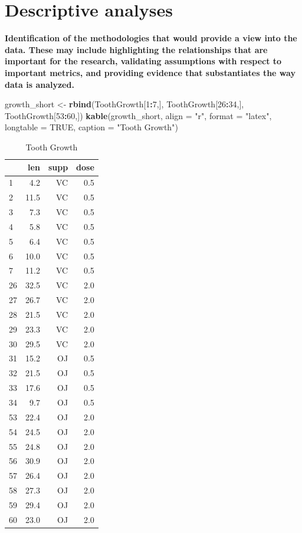 \documentclass[12pt,oneside]{chicagocapstone}
\newenvironment{Shaded}{\begin{snugshade}}{\end{snugshade}}
\newcommand{\KeywordTok}[1]{\textcolor[rgb]{0.13,0.29,0.53}{\textbf{#1}}}
\newcommand{\DataTypeTok}[1]{\textcolor[rgb]{0.13,0.29,0.53}{#1}}
\newcommand{\DecValTok}[1]{\textcolor[rgb]{0.00,0.00,0.81}{#1}}
\newcommand{\StringTok}[1]{\textcolor[rgb]{0.31,0.60,0.02}{#1}}
\newcommand{\OtherTok}[1]{\textcolor[rgb]{0.56,0.35,0.01}{#1}}
\newcommand{\OperatorTok}[1]{\textcolor[rgb]{0.81,0.36,0.00}{\textbf{#1}}}
\newcommand{\NormalTok}[1]{#1}
\begin{document}
\section*{Descriptive analyses}\label{methodology-descriptive}

\textbf{Identification of the methodologies that would provide a view
into the data. These may include highlighting the relationships that are
important for the research, validating assumptions with respect to
important metrics, and providing evidence that substantiates the way
data is analyzed.}
\begin{Shaded}
\begin{Highlighting}[]
\NormalTok{growth_short <-}\StringTok{ }\KeywordTok{rbind}\NormalTok{(ToothGrowth[}\DecValTok{1}\OperatorTok{:}\DecValTok{7}\NormalTok{,], ToothGrowth[}\DecValTok{26}\OperatorTok{:}\DecValTok{34}\NormalTok{,], ToothGrowth[}\DecValTok{53}\OperatorTok{:}\DecValTok{60}\NormalTok{,])}
\KeywordTok{kable}\NormalTok{(growth_short, }\DataTypeTok{align =} \StringTok{"r"}\NormalTok{, }\DataTypeTok{format =} \StringTok{"latex"}\NormalTok{, }
      \DataTypeTok{longtable =} \OtherTok{TRUE}\NormalTok{, }\DataTypeTok{caption =} \StringTok{"Tooth Growth"}\NormalTok{)}
\end{Highlighting}
\end{Shaded}
\begin{longtable}{l|r|r|r}
\caption{\label{tab:datatable}Tooth Growth}\\
\hline
  & len & supp & dose\\
\hline
1 & 4.2 & VC & 0.5\\
\hline
2 & 11.5 & VC & 0.5\\
\hline
3 & 7.3 & VC & 0.5\\
\hline
4 & 5.8 & VC & 0.5\\
\hline
5 & 6.4 & VC & 0.5\\
\hline
6 & 10.0 & VC & 0.5\\
\hline
7 & 11.2 & VC & 0.5\\
\hline
26 & 32.5 & VC & 2.0\\
\hline
27 & 26.7 & VC & 2.0\\
\hline
28 & 21.5 & VC & 2.0\\
\hline
29 & 23.3 & VC & 2.0\\
\hline
30 & 29.5 & VC & 2.0\\
\hline
31 & 15.2 & OJ & 0.5\\
\hline
32 & 21.5 & OJ & 0.5\\
\hline
33 & 17.6 & OJ & 0.5\\
\hline
34 & 9.7 & OJ & 0.5\\
\hline
53 & 22.4 & OJ & 2.0\\
\hline
54 & 24.5 & OJ & 2.0\\
\hline
55 & 24.8 & OJ & 2.0\\
\hline
56 & 30.9 & OJ & 2.0\\
\hline
57 & 26.4 & OJ & 2.0\\
\hline
58 & 27.3 & OJ & 2.0\\
\hline
59 & 29.4 & OJ & 2.0\\
\hline
60 & 23.0 & OJ & 2.0\\
\hline
\end{longtable}
\end{document}
